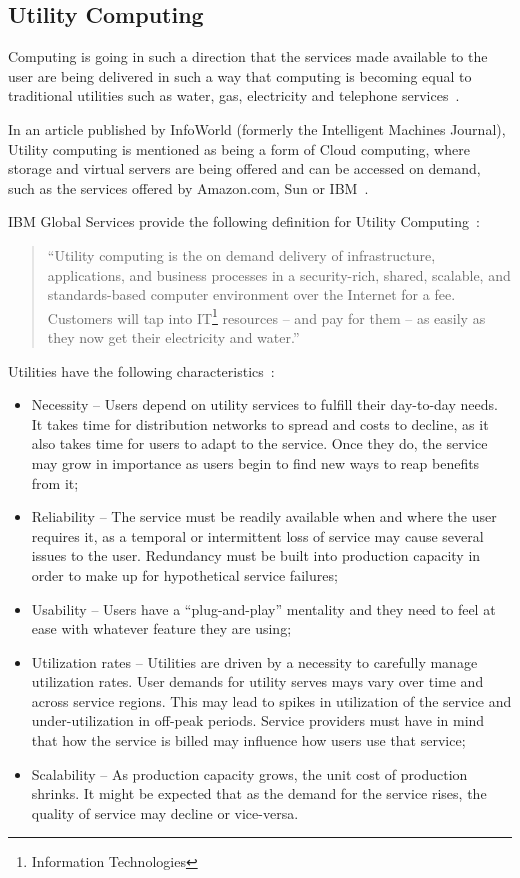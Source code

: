 \subsection{Utility Computing} \label{utility}

Computing is going in such a direction that the services made available to the user are being delivered in such a way that computing is becoming equal to traditional utilities such as water, gas, electricity and telephone services~\cite{Buyya2009599}.

In an article published by InfoWorld (formerly the Intelligent Machines Journal), Utility computing is mentioned as being a form of Cloud computing, where storage and virtual servers are being offered and can be accessed on demand, such as the services offered by Amazon.com, Sun or IBM~\cite{grids-and-clouds}.

IBM Global Services provide the following definition for Utility Computing~\cite{ibm-utility}:

\begin{quote}
``Utility computing is the on demand delivery of infrastructure, applications, and business processes in a security-rich, shared, scalable, and standards-based computer environment over the Internet for a fee. Customers will tap into IT\footnote{Information Technologies} resources -- and pay for them -- as easily as they now get their electricity and water.''
\end{quote}

Utilities have the following characteristics~\cite{ibm-utility}:
\begin{itemize}
\item Necessity -- Users depend on utility services to fulfill their day-to-day needs. It takes time for distribution networks to spread and costs to decline, as it also takes time for users to adapt to the service. Once they do, the service may grow in importance as users begin to find new ways to reap benefits from it;
\item Reliability -- The service must be readily available when and where the user requires it, as a temporal or intermittent loss of service may cause several issues to the user. Redundancy must be built into production capacity in order to make up for hypothetical service failures;
\item Usability -- Users have a ``plug-and-play'' mentality and they need to feel at ease with whatever feature they are using;
\item Utilization rates -- Utilities are driven by a necessity to carefully manage utilization rates. User demands for utility serves mays vary over time and across service regions. This may lead to spikes in utilization of the service and under-utilization in off-peak periods. Service providers must have in mind that how the service is billed may influence how users use that service;
\item Scalability -- As production capacity grows, the unit cost of production shrinks. It might be expected that as the demand for the service rises, the quality of service may decline or vice-versa.
\end{itemize}

